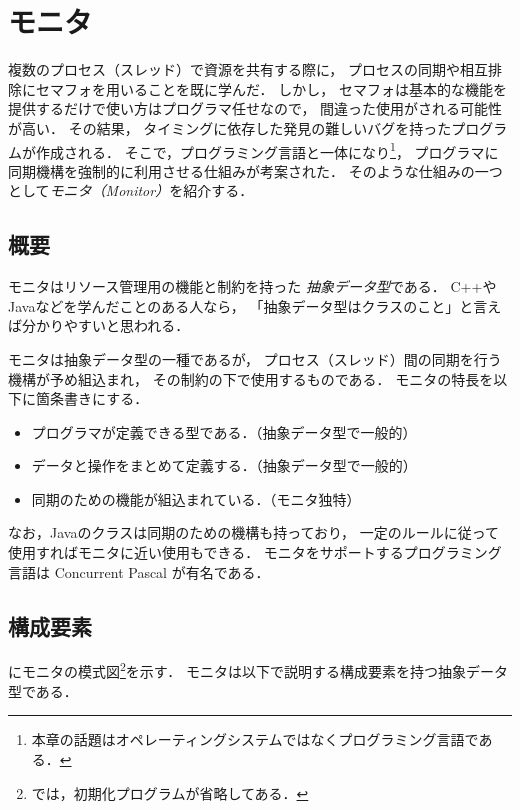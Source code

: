 \chapter{モニタ}
\label{monitor}
複数のプロセス（スレッド）で資源を共有する際に，
プロセスの同期や相互排除にセマフォを用いることを既に学んだ．
しかし，
セマフォは基本的な機能を提供するだけで使い方はプログラマ任せなので，
間違った使用がされる可能性が高い．
その結果，
タイミングに依存した発見の難しいバグを持ったプログラムが作成される．
そこで，プログラミング言語と一体になり\footnote{
  本章の話題はオペレーティングシステムではなくプログラミング言語である．}，
プログラマに同期機構を強制的に利用させる仕組みが考案された．
そのような仕組みの一つとして\emph{モニタ（Monitor）}を紹介する．

\section{概要}
モニタはリソース管理用の機能と制約を持った
\emph{抽象データ型}\cite{AbstractDataType}である．
C++やJavaなどを学んだことのある人なら，
「抽象データ型はクラスのこと」と言えば分かりやすいと思われる．

モニタは抽象データ型の一種であるが，
プロセス（スレッド）間の同期を行う機構が予め組込まれ，
その制約の下で使用するものである．
モニタの特長を以下に箇条書きにする．

\begin{itemize}
\item プログラマが定義できる型である．（抽象データ型で一般的）
\item データと操作をまとめて定義する．（抽象データ型で一般的）
\item 同期のための機能が組込まれている．（モニタ独特）
\end{itemize}

なお，Javaのクラスは同期のための機構も持っており，
一定のルールに従って使用すればモニタに近い使用もできる．
モニタをサポートするプログラミング言語は Concurrent Pascal が有名である．

\section{構成要素}
にモニタの模式図\footnote{
  では，初期化プログラムが省略してある．}を示す．
モニタは以下で説明する構成要素を持つ抽象データ型である．

